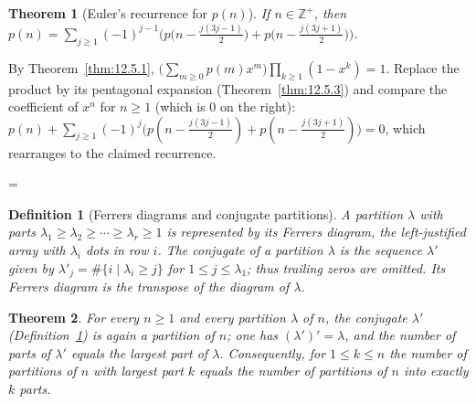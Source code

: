 \documentclass[11pt]{article}
\makeatletter
\theoremstyle{ntstyle}
\newtheorem{theorem}{Theorem}[subsection]
\newtheorem{definition}{Definition}[subsection]
\let\nt@closedisplay\]
\def\nt@guardedclose{\@ifnextchar\par{\nt@closeafterpar}{\@ifnextchar\end{\postdisplaypenalty\@M\nt@closedisplay}{\nt@closedisplay}}}
\def\nt@closeafterpar\par{\@ifnextchar\par{\nt@closeafterpar}{\@ifnextchar\end{\postdisplaypenalty\@M\nt@closedisplay\par}{\nt@closedisplay\par}}}
\renewenvironment{proof}[1][\proofname]{\par
  \pushQED{\qed}\normalfont\topsep\medskipamount\edef\nt@afterproof{\@endparpenalty=\the\@endparpenalty\relax}\@beginparpenalty\@M\@endparpenalty\@M\let\]\nt@guardedclose\trivlist\item[]\textit{#1\@addpunct{.}} \ignorespaces}{\ifvmode\addpenalty\@M\fi\popQED\nt@afterproof\endtrivlist\@endpefalse}
\makeatother
\begin{document}
\begin{theorem}[Euler's recurrence for $p(n)$]\label{thm:12.5.4} If $n\in\mathbb{Z}^+$, then
	$p(n)=\sum_{j\ge1}(-1)^{j-1}\Big(p\big(n-\tfrac{j(3j-1)}{2}\big)+p\big(n-\tfrac{j(3j+1)}{2}\big)\Big)$.

\end{theorem}

\begin{proof} By Theorem~\ref{thm:12.5.1},
	$\big(\sum_{m\ge0}p(m)x^m\big)\prod_{k\ge1}(1-x^k)=1$. Replace the
	product by its pentagonal expansion (Theorem~\ref{thm:12.5.3}) and compare the
	coefficient of $x^n$ for $n\ge1$ (which is $0$ on the right):
	$p(n)+\sum_{j\ge1}(-1)^j\big(p(n-\tfrac{j(3j-1)}{2})+p(n-\tfrac{j(3j+1)}{2})\big)=0$,
	which rearranges to the claimed recurrence.

\end{proof}
\begin{definition}[Ferrers diagrams and conjugate partitions]
	\label{def:12.5.2} A partition
	$\lambda$ with parts $\lambda_1\ge\lambda_2\ge\cdots\ge\lambda_r\ge1$
	is represented by its Ferrers diagram, the left-justified array with
	$\lambda_i$ dots in row $i$.
	The conjugate of a partition $\lambda$ is the sequence $\lambda'$ given by
	$\lambda'_j=\#\{i \mid \lambda_i\ge j\}$ for
	$1\le j\le\lambda_1$; thus trailing zeros are omitted. Its Ferrers
	diagram is the transpose of the diagram of $\lambda$.

\end{definition}
\begin{theorem}\label{thm:12.5.5} For every $n\ge1$ and every partition
	$\lambda$ of $n$, the conjugate $\lambda'$ (Definition~\ref{def:12.5.2}) is again a partition of $n$; one has
	$(\lambda')' = \lambda$, and the number of parts of $\lambda'$ equals
	the largest part of $\lambda$. Consequently, for $1\le k\le n$ the
	number of partitions of $n$ with largest part $k$ equals the number
	of partitions of $n$ into exactly $k$ parts.

\end{theorem}
\end{document}
